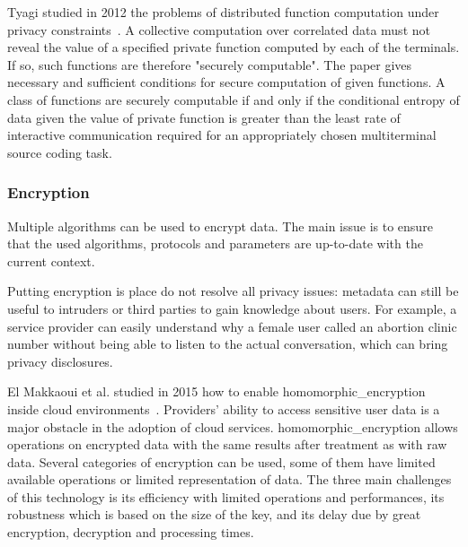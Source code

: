 Tyagi studied in 2012 the problems of distributed function computation under privacy constraints~\cite{tyagi_distributed_2012}. A collective computation over correlated data must not reveal the value of a specified private function computed by each of the terminals. If so, such functions are therefore "securely computable". The paper gives necessary and sufficient conditions for secure computation of given functions. A class of functions are securely computable if and only if the conditional entropy of data given the value of private function is greater than the least rate of interactive communication required for an appropriately chosen multiterminal source coding task. %

\subsubsection{Encryption}
\label{subsubsec:state_review_results_encrption}

Multiple algorithms can be used to encrypt data. The main issue is to ensure that the used algorithms, protocols and parameters are up-to-date with the current context.

Putting encryption is place do not resolve all privacy issues: \gls{metadata} can still be useful to intruders or third parties to gain knowledge about users. For example, a service provider can easily understand why a female user called an abortion clinic number without being able to listen to the actual conversation, which can bring privacy disclosures.

El Makkaoui et al. studied in 2015 how to enable \gls{homomorphic_encryption} inside \gls{cloud} environments~\cite{el_makkaoui_challenges_2015}. Providers' ability to access sensitive user data is a major obstacle in the adoption of \gls{cloud} services. \Gls{homomorphic_encryption} allows operations on encrypted data with the same results after treatment as with raw data. Several categories of encryption can be used, some of them have limited available operations or limited representation of data. The three main challenges of this technology is its efficiency with limited operations and performances, its robustness which is based on the size of the key, and its delay due by great encryption, decryption and processing times. %

